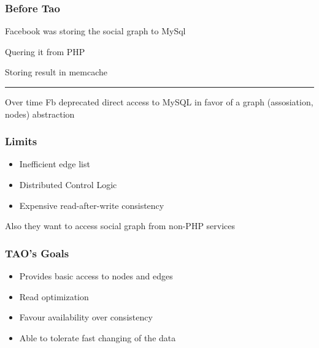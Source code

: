 \begin{frame}
\frametitle{Before Tao}
 	Facebook was storing the social graph to MySql

 	Quering it from PHP

 	Storing result in memcache

 	\hrule 

 	Over time Fb deprecated direct access to MySQL in favor of a graph (assosiation, nodes) abstraction
\end{frame}

\begin{frame}
\frametitle{Limits}
    \begin{itemize}
    	\item Inefficient edge list
    	\item Distributed Control Logic
    	\item Expensive read-after-write consistency
    \end{itemize}
Also they want to access social graph from non-PHP services
\end{frame}

\begin{frame}
\frametitle{TAO's Goals}
	\begin{itemize}
		\item Provides basic access to nodes and edges
		\item Read optimization
		\item Favour availability over consistency
		\item Able to tolerate fast changing of the data
	\end{itemize}
\end{frame}
